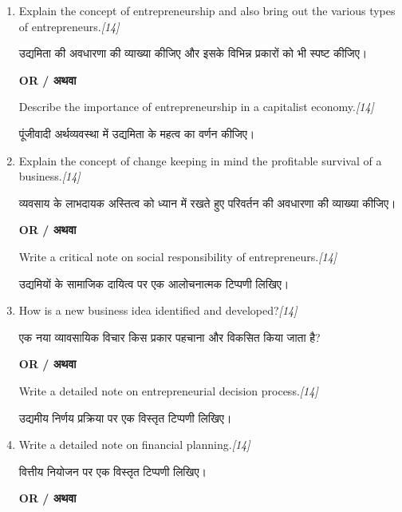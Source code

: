 \documentclass[11pt,a4paper]{article}
\newcommand{\pts}[1]{\hfill \textit{[#1]}}
\begin{document}
\begin{enumerate}[label=\textbf{\arabic*.},leftmargin=*,itemsep=14pt]

  \item Explain the concept of entrepreneurship and also bring out the various types of entrepreneurs.\pts{14}
  
  उद्यमिता की अवधारणा की व्याख्या कीजिए और इसके विभिन्न प्रकारों को भी स्पष्ट कीजिए।

  \begin{center}\textbf{OR / अथवा}\end{center}

  Describe the importance of entrepreneurship in a capitalist economy.\pts{14}
  
  पूंजीवादी अर्थव्यवस्था में उद्यमिता के महत्व का वर्णन कीजिए।

  \item Explain the concept of change keeping in mind the profitable survival of a business.\pts{14}
  
  व्यवसाय के लाभदायक अस्तित्व को ध्यान में रखते हुए परिवर्तन की अवधारणा की व्याख्या कीजिए।

  \begin{center}\textbf{OR / अथवा}\end{center}

  Write a critical note on social responsibility of entrepreneurs.\pts{14}
  
  उद्यमियों के सामाजिक दायित्व पर एक आलोचनात्मक टिप्पणी लिखिए।

  \item How is a new business idea identified and developed?\pts{14}
  
  एक नया व्यावसायिक विचार किस प्रकार पहचाना और विकसित किया जाता है?

  \begin{center}\textbf{OR / अथवा}\end{center}

  Write a detailed note on entrepreneurial decision process.\pts{14}
  
  उद्यमीय निर्णय प्रक्रिया पर एक विस्तृत टिप्पणी लिखिए।

  \item Write a detailed note on financial planning.\pts{14}
  
  वित्तीय नियोजन पर एक विस्तृत टिप्पणी लिखिए।

  \begin{center}\textbf{OR / अथवा}\end{center}


\end{enumerate}
\end{document}
